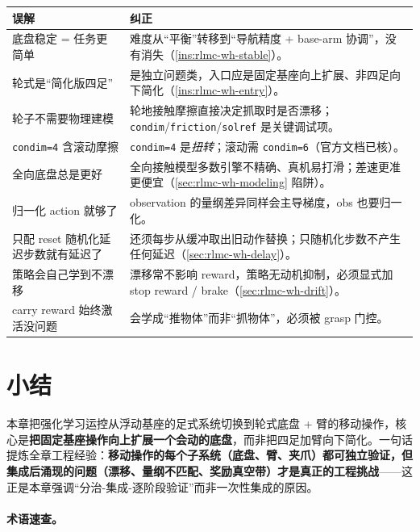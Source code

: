 \begin{center}
\small
\begin{tabular}{@{}p{5.2cm}p{8.0cm}@{}}
\toprule
误解 & 纠正 \\
\midrule
底盘稳定 = 任务更简单 & 难度从“平衡”转移到“导航精度 + base-arm 协调”，没有消失（\cref{ins:rlmc-wh-stable}）。 \\
轮式是“简化版四足” & 是独立问题类，入口应是固定基座向上扩展、非四足向下简化（\cref{ins:rlmc-wh-entry}）。 \\
轮子不需要物理建模 & 轮地接触摩擦直接决定抓取时是否漂移；\verb|condim|/\allowbreak\verb|friction|/\allowbreak\verb|solref| 是关键调试项。 \\
\verb|condim=4| 含滚动摩擦 & \verb|condim=4| 是\emph{扭转}；滚动需 \verb|condim=6|（官方文档已核）。 \\
全向底盘总是更好 & 全向接触模型多数引擎不精确、真机易打滑；差速更准更便宜（\cref{sec:rlmc-wh-modeling} 陷阱）。 \\
归一化 action 就够了 & observation 的量纲差异同样会主导梯度，obs 也要归一化。 \\
只配 reset 随机化延迟步数就有延迟了 & 还须每步从缓冲取出旧动作替换；只随机化步数不产生任何延迟（\cref{sec:rlmc-wh-delay}）。 \\
策略会自己学到不漂移 & 漂移常不影响 reward，策略无动机抑制，必须显式加 stop reward / brake（\cref{sec:rlmc-wh-drift}）。 \\
carry reward 始终激活没问题 & 会学成“推物体”而非“抓物体”，必须被 grasp 门控。 \\
\bottomrule
\end{tabular}
\end{center}

\section{小结}
\label{sec:rlmc-wh-summary}

本章把强化学习运控从浮动基座的足式系统切换到轮式底盘 + 臂的移动操作，核心是\textbf{把固定基座操作向上扩展一个会动的底盘}，而非把四足加臂向下简化。一句话提炼全章工程经验：\textbf{移动操作的每个子系统（底盘、臂、夹爪）都可独立验证，但集成后涌现的问题（漂移、量纲不匹配、奖励真空带）才是真正的工程挑战}——这正是本章强调“分治-集成-逐阶段验证”而非一次性集成的原因。

\paragraph{术语速查。}

